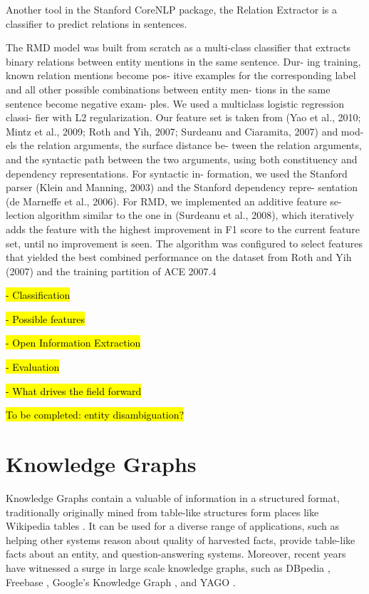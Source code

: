 \documentclass[11pt,a4paper,openright]{memoir}
\begin{document}
Another tool in the Stanford CoreNLP package, the Relation Extractor \cite{Surdeanu:2011:CIE:2021153.2021155} is a classifier to predict relations in sentences.

The RMD model was built from scratch as a multi-class classifier that extracts binary relations between entity mentions in the same sentence. Dur- ing training, known relation mentions become pos- itive examples for the corresponding label and all other possible combinations between entity men- tions in the same sentence become negative exam- ples. We used a multiclass logistic regression classi- fier with L2 regularization. Our feature set is taken from (Yao et al., 2010; Mintz et al., 2009; Roth and Yih, 2007; Surdeanu and Ciaramita, 2007) and mod- els the relation arguments, the surface distance be- tween the relation arguments, and the syntactic path between the two arguments, using both constituency and dependency representations. For syntactic in- formation, we used the Stanford parser (Klein and Manning, 2003) and the Stanford dependency repre- sentation (de Marneffe et al., 2006).
For RMD, we implemented an additive feature se- lection algorithm similar to the one in (Surdeanu et al., 2008), which iteratively adds the feature with the highest improvement in F1 score to the current feature set, until no improvement is seen. The algorithm was configured to select features that yielded the best combined performance on the dataset from Roth and Yih (2007) and the training partition of ACE 2007.4 


\hl{- Classification}

\hl{- Possible features}

\hl{- Open Information Extraction}

\hl{- Evaluation}

\hl{- What drives the field forward}

\hl{To be completed: entity disambiguation?}


%
%
%
%


\section{Knowledge Graphs}

Knowledge Graphs contain a valuable of information in a structured format, traditionally originally mined from table-like structures form places like Wikipedia \cite{wiki} tables \cite{dbpedia-swj}. It can be used for a diverse range of applications, such as helping other systems reason about quality of harvested facts\cite{Suchanek2007}, provide table-like facts about an entity\cite{google}, and question-answering systems\cite{hixon-clark-hajishirzi-2015}. Moreover, recent years have witnessed a surge in large scale knowledge graphs, such as DBpedia \cite{dbpedia-swj}, Freebase \cite{Bollacker2008}, Google’s Knowledge Graph \cite{google}, and YAGO \cite{Suchanek2007}.
\end{document}
